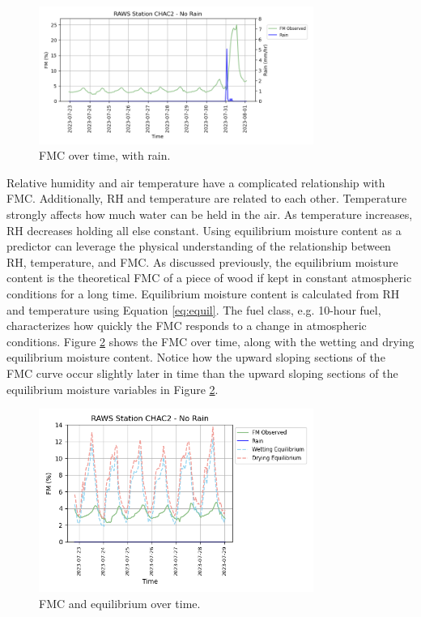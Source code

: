 \documentclass[11pt]{article}%
\begin{document}
\begin{figure}[ht]
    \centering
    \includegraphics[width=0.8\textwidth]{images/rain_plot.png}
    \caption{FMC over time, with rain.}
    \label{fig:fmc_with_rain}
\end{figure}

Relative humidity and air temperature have a complicated relationship with FMC. Additionally, RH and temperature are related to each other. Temperature strongly affects how much water can be held in the air. As temperature increases, RH decreases holding all else constant. Using equilibrium moisture content as a predictor can leverage the physical understanding of the relationship between RH, temperature, and FMC. As discussed previously, the equilibrium moisture content is the theoretical FMC of a piece of wood if kept in constant atmospheric conditions for a long time. Equilibrium moisture content is calculated from RH and temperature using Equation \ref{eq:equil}. The fuel class, e.g. 10-hour fuel, characterizes how quickly the FMC responds to a change in atmospheric conditions. Figure \ref{fig:eq_plot} shows the FMC over time, along with the wetting and drying equilibrium moisture content. Notice how the upward sloping sections of the FMC curve occur slightly later in time than the upward sloping sections of the equilibrium moisture variables in Figure \ref{fig:eq_plot}. 

\begin{figure}[ht]
    \centering
    \includegraphics[width=0.8\textwidth]{images/eq_plot.png}
    \caption{FMC and equilibrium over time.}
    \label{fig:eq_plot}
\end{figure}
\end{document}

